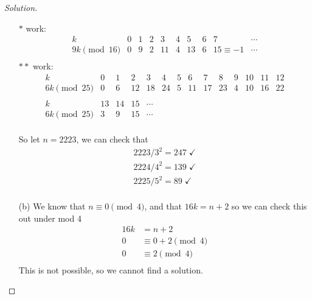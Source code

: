 \documentclass[11pt]{article}
\newenvironment{solution}
  {\renewcommand\qedsymbol{$~$}\begin{proof}[Solution]$ $\par\nobreak\ignorespaces}
  {\end{proof}}
\begin{document}
\begin{solution}
\begin{itemize}
              $*$ work:
              \[
                  \begin{array}{r||*{9}{c}}
                      k            & 0 & 1 & 2 & 3  & 4 & 5  & 6 & 7           & \cdots \\
                      \hline
                      9k \pmod{16} & 0 & 9 & 2 & 11 & 4 & 13 & 6 & 15\equiv -1 & \cdots \\
                  \end{array}
              \]
              $**$ work:
              \[
                  \begin{array}{r||*{14}{c}}
                      k            & 0  & 1  & 2  & 3      & 4  & 5 & 6  & 7  & 8  & 9 & 10 & 11 & 12 \\
                      \hline
                      6k \pmod{25} & 0  & 6  & 12 & 18     & 24 & 5 & 11 & 17 & 23 & 4 & 10 & 16 & 22 \\
                      \\
                      k            & 13 & 14 & 15 & \cdots                                            \\
                      \hline
                      6k \pmod{25} & 3  & 9  & 15 & \cdots                                            \\
                  \end{array}
              \]

              So let $n=2223$, we can check that
              \begin{align*}
                  2223 / 3^2 = 247 \;\checkmark \\
                  2224 / 4^2 = 139 \;\checkmark \\
                  2225 / 5^2 = 89 \;\checkmark  \\
              \end{align*}
        \item [(b)] We know that $n \equiv 0 \pmod{4}$, and that $16k=n+2$ so we can check this out under mod 4
              \begin{align*}
                  16k & = n+2                 \\
                  0   & \equiv 0 + 2 \pmod{4} \\
                  0   & \equiv 2 \pmod{4}     \\
              \end{align*}
              This is not possible, so we cannot find a solution.
    \end{itemize}
\end{solution}
\end{document}
